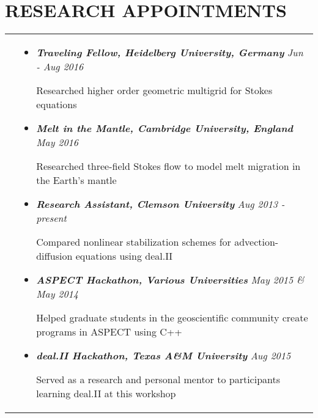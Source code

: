 \documentclass[10pt]{article}
\begin{document}
\section{\textbf{RESEARCH APPOINTMENTS}}
\vspace*{-\baselineskip}
\hskip-1.7in
\begin{tabularx}{1.5\linewidth}{>{\raggedleft\scshape}p{3cm}X}

  &\begin{itemize}
    \setlength\itemsep{.005em}
    
\item \textbf{\textit{Traveling Fellow, Heidelberg University, Germany}} \hspace{33 mm}\textit{Jun - Aug 2016}

Researched higher order geometric multigrid for Stokes equations
 
            \item \textbf{\textit{Melt in the Mantle, Cambridge University, England}} \hspace{29.5 mm}\textit{May 2016}
            
Researched three-field Stokes flow to model melt migration in the Earth's mantle
             
    
  \item \textbf{\textit{Research Assistant, Clemson University}}    \hspace{50 mm}\textit{Aug 2013 - present}

	Compared nonlinear stabilization schemes for advection-diffusion equations using deal.II
             

             
\item \textbf{\textit{ASPECT Hackathon, Various Universities}} \hspace{46 mm}\textit{May 2015 \& May 2014}
  
            
            Helped graduate students in the geoscientific community create programs in ASPECT using C++ 
             
\item \textbf{\textit{deal.II Hackathon, Texas A\&M University}} \hspace{46 mm}\textit{Aug 2015}
  
            Served as a research and personal mentor to participants learning deal.II at this workshop
            

  \end{itemize} 

\end{tabularx}
 
\end{document}
